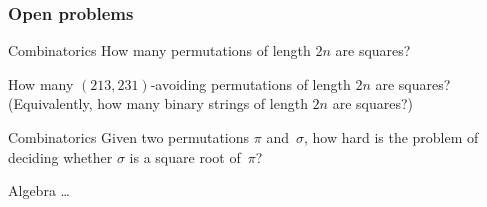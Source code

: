 \documentclass[unknownkeysallowed,10pt,xcolor={dvipsnames}]{beamer}
\begin{document}

\begin{frame}
  \frametitle{Open problems}

  \begin{block}{Combinatorics}
    How many permutations of length $2n$ are squares?

    \smallskip

    How many $(213,231)$-avoiding
    permutations of length $2n$ are squares? (Equivalently,
    how many binary strings of length $2n$ are squares?)
  \end{block}

  \medskip

  \begin{block}{Combinatorics}
    Given two permutations $\pi$ and~$\sigma$, how hard is the problem of
    deciding whether $\sigma$ is a square root of~$\pi$?
  \end{block}

  \medskip

  \begin{block}{Algebra}
    \ldots
  \end{block}

\end{frame}

\end{document}
